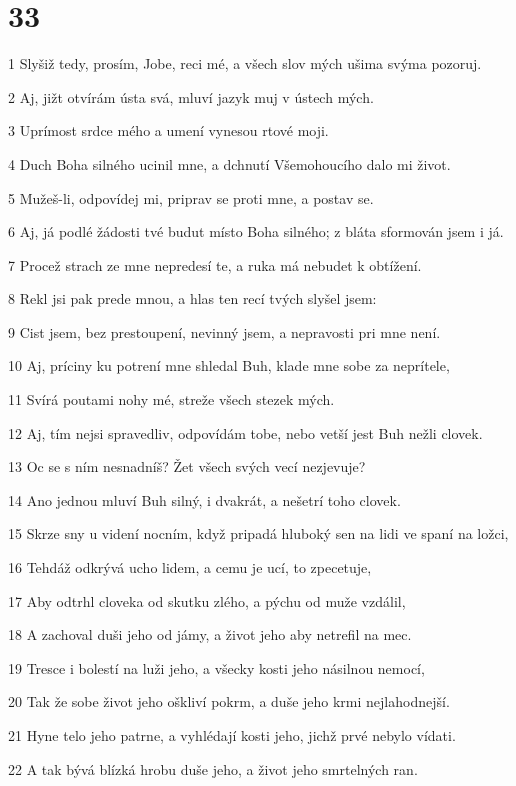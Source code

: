 \chapter{33}

\par 1 Slyšiž tedy, prosím, Jobe, reci mé, a všech slov mých ušima svýma pozoruj.
\par 2 Aj, jižt otvírám ústa svá, mluví jazyk muj v ústech mých.
\par 3 Uprímost srdce mého a umení vynesou rtové moji.
\par 4 Duch Boha silného ucinil mne, a dchnutí Všemohoucího dalo mi život.
\par 5 Mužeš-li, odpovídej mi, priprav se proti mne, a postav se.
\par 6 Aj, já podlé žádosti tvé budut místo Boha silného; z bláta sformován jsem i já.
\par 7 Procež strach ze mne nepredesí te, a ruka má nebudet k obtížení.
\par 8 Rekl jsi pak prede mnou, a hlas ten recí tvých slyšel jsem:
\par 9 Cist jsem, bez prestoupení, nevinný jsem, a nepravosti pri mne není.
\par 10 Aj, príciny ku potrení mne shledal Buh, klade mne sobe za neprítele,
\par 11 Svírá poutami nohy mé, streže všech stezek mých.
\par 12 Aj, tím nejsi spravedliv, odpovídám tobe, nebo vetší jest Buh nežli clovek.
\par 13 Oc se s ním nesnadníš? Žet všech svých vecí nezjevuje?
\par 14 Ano jednou mluví Buh silný, i dvakrát, a nešetrí toho clovek.
\par 15 Skrze sny u videní nocním, když pripadá hluboký sen na lidi ve spaní na ložci,
\par 16 Tehdáž odkrývá ucho lidem, a cemu je ucí, to zpecetuje,
\par 17 Aby odtrhl cloveka od skutku zlého, a pýchu od muže vzdálil,
\par 18 A zachoval duši jeho od jámy, a život jeho aby netrefil na mec.
\par 19 Tresce i bolestí na luži jeho, a všecky kosti jeho násilnou nemocí,
\par 20 Tak že sobe život jeho oškliví pokrm, a duše jeho krmi nejlahodnejší.
\par 21 Hyne telo jeho patrne, a vyhlédají kosti jeho, jichž prvé nebylo vídati.
\par 22 A tak bývá blízká hrobu duše jeho, a život jeho smrtelných ran.
